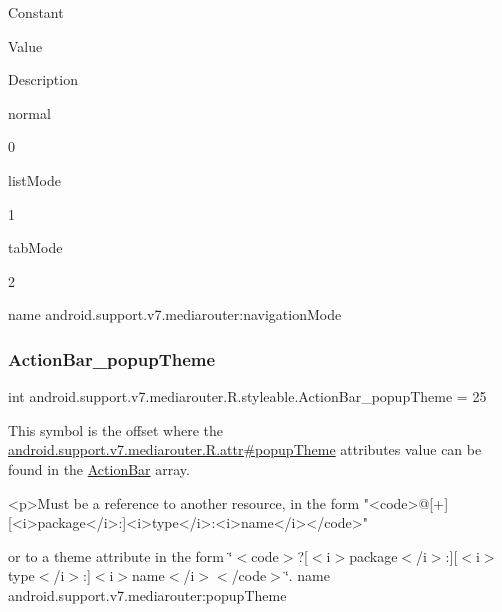 Constant

Value

Description 

{\ttfamily normal}

0

{\ttfamily list\+Mode}

1

{\ttfamily tab\+Mode}

2

name android.\+support.\+v7.\+mediarouter\+:navigation\+Mode \mbox{\label{classandroid_1_1support_1_1v7_1_1mediarouter_1_1R_1_1styleable_aa0992ab7275b62ffde97216eab719afa}} 
\subsubsection{\texorpdfstring{Action\+Bar\+\_\+popup\+Theme}{ActionBar\_popupTheme}}
{\footnotesize\ttfamily int android.\+support.\+v7.\+mediarouter.\+R.\+styleable.\+Action\+Bar\+\_\+popup\+Theme = 25\hspace{0.3cm}{\ttfamily [static]}}

This symbol is the offset where the \hyperlink{classandroid_1_1support_1_1v7_1_1mediarouter_1_1R_1_1attr_af485292b7952a70814e465517913886a}{android.\+support.\+v7.\+mediarouter.\+R.\+attr\#popup\+Theme} attribute\textquotesingle{}s value can be found in the \hyperlink{classandroid_1_1support_1_1v7_1_1mediarouter_1_1R_1_1styleable_adc4d3c0d096085367f12d025007aa53f}{Action\+Bar} array.

\begin{DoxyVerb}      <p>Must be a reference to another resource, in the form "<code>@[+][<i>package</i>:]<i>type</i>:<i>name</i></code>"
\end{DoxyVerb}
 or to a theme attribute in the form \char`\"{}$<$code$>$?\mbox{[}$<$i$>$package$<$/i$>$\+:\mbox{]}\mbox{[}$<$i$>$type$<$/i$>$\+:\mbox{]}$<$i$>$name$<$/i$>$$<$/code$>$\char`\"{}.  name android.\+support.\+v7.\+mediarouter\+:popup\+Theme \mbox{\label{classandroid_1_1support_1_1v7_1_1mediarouter_1_1R_1_1styleable_ae3c6eae45f61967228281bbb4ea316bf}} 
